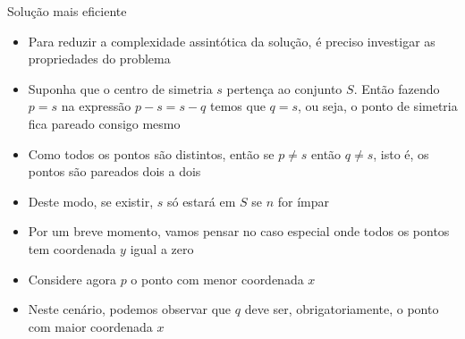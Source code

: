 \begin{frame}[fragile]{Solução mais eficiente}

    \begin{itemize}
        \item Para reduzir a complexidade assintótica da solução, é preciso investigar as
            propriedades do problema
        \pause

        \item Suponha que o centro de simetria $s$ pertença ao conjunto $S$. Então fazendo $p = s$
            na expressão $p - s = s - q$ temos que $q = s$, ou seja, o ponto de simetria fica
            pareado consigo mesmo
        \pause

        \item Como todos os pontos são distintos, então se $p\neq s$ então $q\neq s$, isto é,
            os pontos são pareados dois a dois
        \pause

        \item Deste modo, se existir, $s$ só estará em $S$ se $n$ for ímpar
        \pause

        \item Por um breve momento, vamos pensar no caso especial onde todos os pontos tem
            coordenada $y$ igual a zero
        \pause

        \item Considere agora $p$ o ponto com menor coordenada $x$
        \pause

        \item Neste cenário, podemos observar que $q$ deve ser, obrigatoriamente, o ponto com
            maior coordenada $x$
    \end{itemize}

\end{frame}

